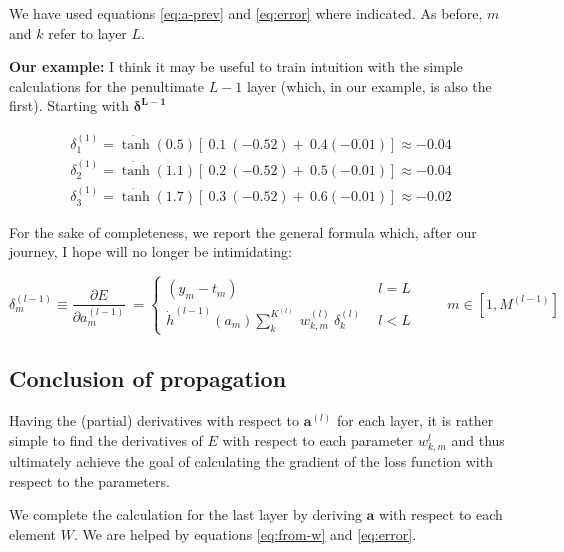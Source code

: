 \documentclass{article}
\begin{document}
We have used equations \eqref{eq:a-prev} and \eqref{eq:error} where indicated. As before, $m$ and $k$ refer to layer $L$.

\textbf{Our example:} I think it may be useful to train intuition with the simple calculations for the penultimate $L-1$ layer (which, in our example, is also the first). Starting with $\boldsymbol{\delta^{L-1}}$


\begin{gather*}
\delta _{1}^{( 1)} =\dot{\tanh}( 0.5)[ \ 0.1\ ( -0.52) +\ 0.4( -0.01)] \approx -0.04\\
\delta _{2}^{( 1)} =\dot{\tanh}( 1.1)[ \ 0.2\ ( -0.52) +\ 0.5( -0.01)] \approx -0.04\\
\delta _{3}^{( 1)} =\dot{\tanh}( 1.7)[ \ 0.3\ ( -0.52) +\ 0.6( -0.01)]  \approx -0.02
\end{gather*}

\begin{center}\textleaf\end{center}


For the sake of completeness, we report the general formula which, after our journey, I hope will no longer be intimidating:


\begin{equation}
\delta _{m}^{( l-1)} \equiv \frac{\partial E}{\partial a_{m}^{( l-1)}} \ =\begin{cases}
( y_{m} -t_{m}) & l=L\\
\dot{h}^{( l-1)}( a_{m})\sum _{k}^{K^{( l)}} \ w_{k,m}^{( l)} \ \delta _{k}^{( l)} \ \  & l< L
\end{cases} \ \ \ \ \ \ \ \ \ \ m\in \left[ 1,M^{( l-1)}\right] \label{eq:backprop}
\end{equation}


\subsection{Conclusion of propagation}

Having the (partial) derivatives with respect to $\boldsymbol{a}^{(l)}$ for each layer, it is rather simple to find the derivatives of $E$ with respect to each parameter $w_{k,m}^{l}$ and thus ultimately achieve the goal of calculating the gradient of the loss function with respect to the parameters.

We complete the calculation for the last layer by deriving $\boldsymbol{a}$ with respect to each element $W$. We are helped by equations \eqref{eq:from-w} and \eqref{eq:error}.
\end{document}

